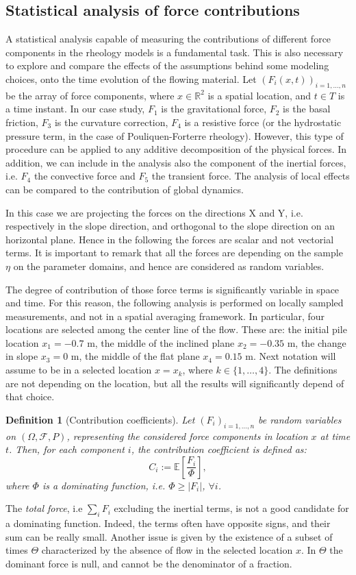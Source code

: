 \documentclass{article}
\newtheorem{definition}[theorem]{Definition}
\begin{document}
\subsection{Statistical analysis of force contributions}
A statistical analysis capable of measuring the contributions of different force components in the rheology models is a fundamental task. This is also necessary to explore and compare the effects of the assumptions behind some modeling choices, onto the time evolution of the flowing material. Let $(F_i(x,t))_{i=1,\dots, n}$ be the array of force components, where $x\in\mathbb R^2$ is a spatial location, and $t\in T$ is a time instant. In our case study, $F_1$ is the gravitational force, $F_2$ is the basal friction, $F_3$ is the curvature correction, $F_4$ is a resistive force (or the hydrostatic pressure term, in the case of Pouliquen-Forterre rheology). However, this type of procedure can be applied to any additive decomposition of the physical forces. In addition, we can include in the analysis also the component of the inertial forces, i.e. $F_4$ the convective force and $F_5$ the transient force. The analysis of local effects can be compared to the contribution of global dynamics.

In this case we are projecting the forces on the directions X and Y, i.e. respectively in the slope direction, and orthogonal to the slope direction on an horizontal plane. Hence in the following the forces are scalar and not vectorial terms. It is important to remark that all the forces are depending on the sample $\eta$ on the parameter domains, and hence are considered as random variables.

The degree of contribution of those force terms is significantly variable in space and time. For this reason, the following analysis is performed on locally sampled measurements, and not in a spatial averaging framework. In particular, four locations are selected among the center line of the flow. These are: the initial pile location $x_1=-0.7$ m, the middle of the inclined plane $x_2=-0.35$ m, the change in slope $x_3=0$ m, the middle of the flat plane $x_4=0.15$ m. Next notation will assume to be in a selected location $x=x_k$, where $k\in\{1,\dots, 4\}$. The definitions are not depending on the location, but all the results will significantly depend of that choice.

\begin{definition}[Contribution coefficients]
Let $(F_i)_{i=1,\dots, n}$ be random variables on $(\Omega, \mathcal F, P)$, representing the considered force components in location $x$ at time $t$. Then, for each component $i$, the contribution coefficient is defined as:
$$C_i:=\mathbb E\left[\frac{F_i}{\Phi}\right],$$
where $\Phi$ is a dominating function, i.e. $\Phi\ge |F_i|$, $\forall i$.
\end{definition}
The \emph{total force}, i.e $\sum_i F_i$ excluding the inertial terms, is not a good candidate for a dominating function. Indeed, the terms often have opposite signs, and their sum can be really small. Another issue is given by the existence of a subset of times $\Theta$ characterized by the absence of flow in the selected location $x$. In $\Theta$ the dominant force is null, and cannot be the denominator of a fraction.
\end{document}
